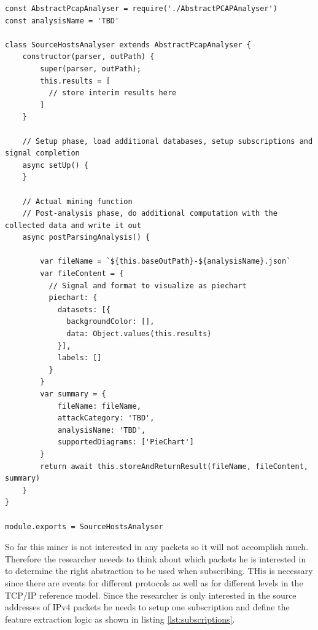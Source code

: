 \begin{lstlisting}[caption={Initial content of the newly create Miner},float=H,label={lst:initialtemplate}]
const AbstractPcapAnalyser = require('./AbstractPCAPAnalyser')
const analysisName = 'TBD'

class SourceHostsAnalyser extends AbstractPcapAnalyser {
    constructor(parser, outPath) {
        super(parser, outPath);
        this.results = [
          // store interim results here
        ]
    }

    // Setup phase, load additional databases, setup subscriptions and signal completion
    async setUp() {
    }

    // Actual mining function
    // Post-analysis phase, do additional computation with the collected data and write it out
    async postParsingAnalysis() {

        var fileName = `${this.baseOutPath}-${analysisName}.json`
        var fileContent = {
          // Signal and format to visualize as piechart
          piechart: {
            datasets: [{
              backgroundColor: [],
              data: Object.values(this.results)
            }],
            labels: []
          }
        }
        var summary = {
            fileName: fileName,
            attackCategory: 'TBD',
            analysisName: 'TBD',
            supportedDiagrams: ['PieChart']
        }
        return await this.storeAndReturnResult(fileName, fileContent, summary)
    }
}

module.exports = SourceHostsAnalyser

\end{lstlisting}

So far this miner is not interested in any packets so it will not accomplish much. Therefore the researcher neeeds to think about which packets he is interested in to determine the right abstraction to be used when subscribing. THis is necessary since there are events for different protocols as well as for different levels in the TCP/IP reference model. Since the researcher is only interested in the source addresses of IPv4 packets he needs to setup one subscription and define the feature extraction logic as shown in listing \ref{lst:subscriptions}.

